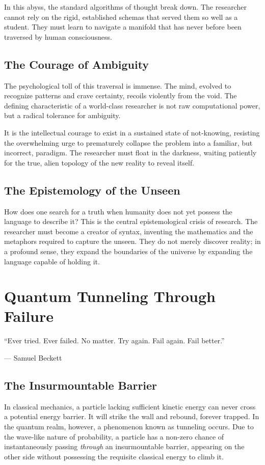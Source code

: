 \documentclass[11pt,a4paper,oneside]{book}
\theoremstyle{definition}
\theoremstyle{remark}
\begin{document}
In this abyss, the standard algorithms of thought break down. The researcher cannot rely on the rigid, established schemas that served them so well as a student. They must learn to navigate a manifold that has never before been traversed by human consciousness.

\section{The Courage of Ambiguity}
The psychological toll of this traversal is immense. The mind, evolved to recognize patterns and crave certainty, recoils violently from the void. The defining characteristic of a world-class researcher is not raw computational power, but a radical tolerance for ambiguity. 

It is the intellectual courage to exist in a sustained state of not-knowing, resisting the overwhelming urge to prematurely collapse the problem into a familiar, but incorrect, paradigm. The researcher must float in the darkness, waiting patiently for the true, alien topology of the new reality to reveal itself.

\section{The Epistemology of the Unseen}
How does one search for a truth when humanity does not yet possess the language to describe it? This is the central epistemological crisis of research. The researcher must become a creator of syntax, inventing the mathematics and the metaphors required to capture the unseen. They do not merely discover reality; in a profound sense, they expand the boundaries of the universe by expanding the language capable of holding it.

\chapter{Quantum Tunneling Through Failure}
\epigraph{``Ever tried. Ever failed. No matter. Try again. Fail again. Fail better.''}{--- Samuel Beckett}

\section{The Insurmountable Barrier}
In classical mechanics, a particle lacking sufficient kinetic energy can never cross a potential energy barrier. It will strike the wall and rebound, forever trapped. In the quantum realm, however, a phenomenon known as tunneling occurs. Due to the wave-like nature of probability, a particle has a non-zero chance of instantaneously passing \textit{through} an insurmountable barrier, appearing on the other side without possessing the requisite classical energy to climb it.
\end{document}
